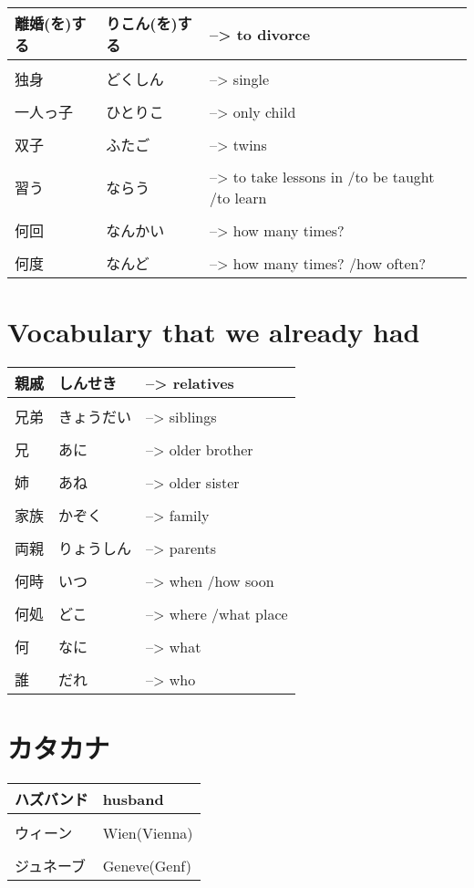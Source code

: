 \documentclass{article}
\begin{document}
\begin{tabular}{ l | l l }
離婚(を)する&りこん(を)する&--> to divorce \\ \hline\\[-1em]
独身&どくしん&--> single \\ \hline\\[-1em] 
一人っ子&ひとりこ&--> only child \\ \hline\\[-1em]
双子&ふたご&--> twins \\ \hline\\[-1em]
習う&ならう&--> to take lessons in /to be taught /to learn \\ \hline\\[-1em]
何回&なんかい&--> how many times? \\ \hline\\[-1em]
何度&なんど&--> how many times? /how often? %
\end{tabular}

\part*{Vocabulary that we already had}
\begin{tabular}{ l | l l }
親戚&しんせき&--> relatives \\ \hline\\[-1em]
兄弟&きょうだい&--> siblings \\ \hline\\[-1em]
兄&あに&--> older brother \\ \hline\\[-1em]
姉&あね&--> older sister \\ \hline\\[-1em]
家族&かぞく&--> family \\ \hline\\[-1em]
両親&りょうしん&--> parents \\ \hline\\[-1em]
何時&いつ&--> when /how soon \\ \hline\\[-1em]
何処&どこ&--> where /what place \\ \hline\\[-1em]
何&なに&--> what \\ \hline\\[-1em]
誰&だれ&--> who %
\end{tabular}

\part*{カタカナ}
\begin{tabular}{ l | l }
ハズバンド&husband \\ \hline\\[-1em]
ウィーン&Wien(Vienna) \\ \hline\\[-1em]
ジュネーブ&Geneve(Genf)
\end{tabular}
\end{document}
